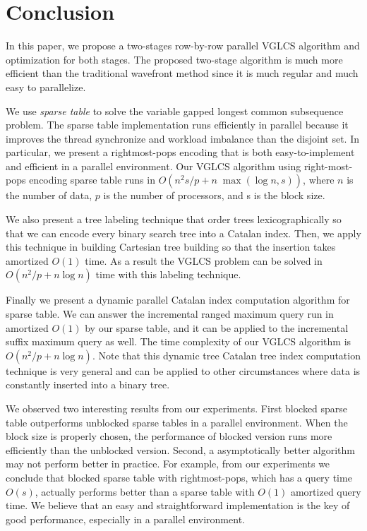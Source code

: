 \section{Conclusion}
\label{sec:Conclusion}

In this paper, we propose a two-stages row-by-row parallel VGLCS
algorithm and optimization for both stages.  The proposed two-stage
algorithm is much more efficient than the traditional wavefront method
since it is much regular and much easy to parallelize.


We use {\em sparse table} to solve the variable gapped longest common
subsequence problem.  The sparse table implementation runs efficiently
in parallel because it improves the thread synchronize and workload
imbalance than the disjoint set.  In particular, we present a
rightmost-pops encoding that is both easy-to-implement and efficient
in a parallel environment.  Our VGLCS algorithm using right-most-pops
encoding sparse table runs in $O(n^2 s / p + n \; \max(\log n, s))$,
where $n$ is the number of data, $p$ is the number of processors, and
s is the block size.

We also present a tree labeling technique that order trees
lexicographically so that we can encode every binary search tree into
a Catalan index.  Then, we apply this technique in building Cartesian
tree building so that the insertion takes amortized $O(1)$ time.  As a
result the VGLCS problem can be solved in $O(n^2 / p + n \log n)$
time with this labeling technique.

Finally we present a dynamic parallel Catalan index computation
algorithm for sparse table.  We can answer the incremental ranged
maximum query run in amortized $O(1)$ by our sparse table, and it can
be applied to the incremental suffix maximum query as well.  The time
complexity of our VGLCS algorithm is $O(n^2 / p + n \log n)$.  Note
that this dynamic tree Catalan tree index computation technique is
very general and can be applied to other circumstances where data is
constantly inserted into a binary tree.

We observed two interesting results from our experiments.  First
blocked sparse table outperforms unblocked sparse tables in a
parallel environment.  When the block size is properly chosen, the
performance of blocked version runs more efficiently than the unblocked
version.  Second, a asymptotically better algorithm may not perform
better in practice.  For example, from our experiments we conclude
that blocked sparse table with rightmost-pops, which has a query time
$O(s)$, actually performs better than a sparse table with $O(1)$
amortized query time.  We believe that an easy and straightforward
implementation is the key of good performance, especially in a
parallel environment.
